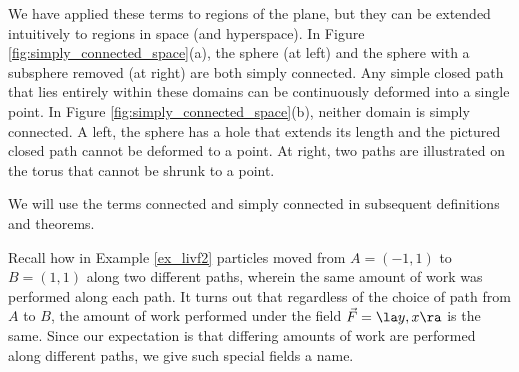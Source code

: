 We have applied these terms to regions of the plane, but they can be extended intuitively to regions in space (and hyperspace). In Figure \ref{fig:simply_connected_space}(a), the sphere (at left) and the sphere with a subsphere removed (at right) are both simply connected. Any simple closed path that lies entirely within these domains can be continuously deformed into a single point. In Figure \ref{fig:simply_connected_space}(b), neither domain is simply connected. A left, the sphere has a hole that extends its length and the pictured closed path cannot be deformed to a point. At right, two paths are illustrated on the torus that cannot be shrunk to a point. 

We will use the terms connected and simply connected in subsequent definitions and theorems.



Recall how in Example \ref{ex_livf2} particles moved from $A = (-1,1)$ to $B = (1,1)$ along two different paths, wherein the same amount of work was performed along each path. It turns out that regardless of the choice of path from $A$ to $B$, the amount of work performed under the field $\vec F = \la y, x\ra$ is the same. Since our expectation is that differing amounts of work are performed along different paths, we give such special fields a name. %

